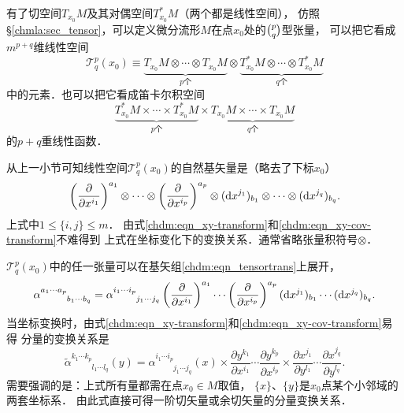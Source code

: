 有了切空间$T_{x_0}M$及其对偶空间$T_{x_0}^{*}M$（两个都是线性空间），
仿照\S\ref{chmla:sec_tensor}，可以定义微分流形$M$在点$x_0$处的$\binom{p}{q}$型张量，
可以把它看成$m^{p+q}$维线性空间
\begin{equation}\label{chdm:eqn_TM-TsM}
    \mathcal{T}^p_q(x_0) \equiv \underbrace{T_{x_0}M\otimes \cdots \otimes T_{x_0}M}_{p\text{个}}
    \otimes \underbrace{T_{x_0}^{*}M\otimes \cdots \otimes T_{x_0}^{*}M}_{q\text{个}}
\end{equation}
中的元素．也可以把它看成笛卡尔积空间
\begin{equation}\label{chdm:eqn_TM-X-TsM}
    \underbrace{T_{x_0}^{*}M \times \cdots \times T_{x_0}^{*}M}_{p\text{个}}
    \times \underbrace{T_{x_0}M\times \cdots \times T_{x_0}M}_{q\text{个}}
\end{equation}
的$p+q$重线性函数．


从上一小节可知线性空间$\mathcal{T}^p_q(x_0)$的自然基矢量是（略去了下标$x_0$）
\begin{equation}\label{chdm:eqn_tensortrans}
    \left(\frac{\partial }{\partial x^{i_1}}\right)^{a_1} \otimes \cdots \otimes
    \left(\frac{\partial }{\partial x^{i_p}}\right)^{a_p} \otimes
    ({\rm d}x^{j_1})_{b_1} \otimes \cdots \otimes ({\rm d}x^{j_q})_{b_q} .
\end{equation}
上式中$1\leqslant \{i,j\} \leqslant m $．
由式\eqref{chdm:eqn_xy-transform}和\eqref{chdm:eqn_xy-cov-transform}不难得到
上式在坐标变化下的变换关系．通常省略张量积符号$\otimes$．

$\mathcal{T}^p_q(x_0)$中的任一张量可以在基矢组\eqref{chdm:eqn_tensortrans}上展开，
\begin{equation}\label{chdm:eqn_tensor-component}
    \alpha^{a_1 \cdots a_p}_{\phantom{a_1 \cdots a_p}b_1\cdots b_q} 
     = \alpha^{i_1 \cdots i_p}_{\phantom{i_1 \cdots i_p}j_1\cdots j_q} 
      \left(\frac{\partial }{\partial x^{i_1}}\right)^{a_1} \cdots 
      \left(\frac{\partial }{\partial x^{i_p}}\right)^{a_p} 
      ({\rm d}x^{j_1})_{b_1} \cdots  ({\rm d}x^{j_q})_{b_q}    .
\end{equation}
当坐标变换时，由式\eqref{chdm:eqn_xy-transform}和\eqref{chdm:eqn_xy-cov-transform}易得
分量的变换关系是
\begin{equation}\label{chdm:eqn_tensor-component-trans}
    \tilde{\alpha}^{k_1 \cdots k_p}_{\phantom{k_1 \cdots k_p}l_1\cdots l_q} (y)
    ={\alpha}^{i_1 \cdots i_p}_{\phantom{i_1 \cdots i_p}j_1\cdots j_q} (x) \times
    \frac{\partial y^{k_1}}{\partial x^{i_1}} \cdots 
    \frac{\partial y^{k_p}}{\partial x^{i_p}} \times
    \frac{\partial x^{j_1}}{\partial y^{l_1}} \cdots 
    \frac{\partial x^{j_q}}{\partial y^{l_q}} .
\end{equation}
需要强调的是：上式所有量都需在点$x_0\in M$取值，
$\{x\}$、$\{y\}$是$x_0$点某个小邻域的两套坐标系．
由此式直接可得一阶切矢量或余切矢量的分量变换关系．


